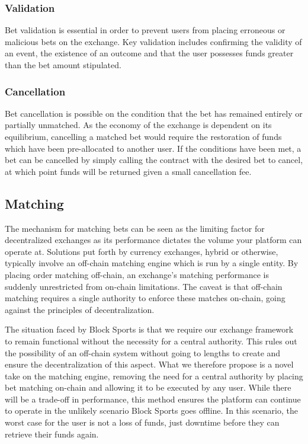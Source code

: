 \documentclass{article}
\begin{document}
	\subsubsection{Validation}
Bet validation is essential in order to prevent users from placing erroneous or malicious bets on the exchange. Key validation includes confirming the validity of an event, the existence of an outcome and that the user possesses funds greater than the bet amount stipulated.

\subsubsection{Cancellation}
Bet cancellation is possible on the condition that the bet has remained entirely or partially unmatched. As the economy of the exchange is dependent on its equilibrium, cancelling a matched bet would require the restoration of funds which have been pre-allocated to another user. If the conditions have been met, a bet can be cancelled by simply calling the contract with the desired bet to cancel, at which point funds will be returned given a small cancellation fee.

	\subsection{Matching}
The mechanism for matching bets can be seen as the limiting factor for decentralized exchanges as its performance dictates the volume your platform can operate at. Solutions put forth by currency exchanges, hybrid or otherwise, typically involve an off-chain matching engine which is run by a single entity. By placing order matching off-chain, an exchange’s matching performance is suddenly unrestricted from on-chain limitations. The caveat is that off-chain matching requires a single authority to enforce these matches on-chain, going against the principles of decentralization.

The situation faced by Block Sports is that we require our exchange framework to remain functional without the necessity for a central authority. This rules out the possibility of an off-chain system without going to lengths to create and ensure the decentralization of this aspect. What we therefore propose is a novel take on the matching engine, removing the need for a central authority by placing bet matching on-chain and allowing it to be executed by any user. While there will be a trade-off in performance, this method ensures the platform can continue to operate in the unlikely scenario Block Sports goes offline. In this scenario, the worst case for the user is not a loss of funds, just downtime before they can retrieve their funds again.
\end{document}
